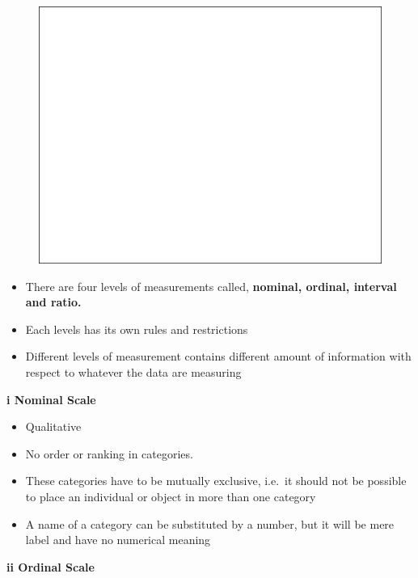 \documentclass[]{book}
\providecommand{\tightlist}{%
  \setlength{\itemsep}{0pt}\setlength{\parskip}{0pt}}
\begin{document}
\begin{figure}

{\centering \includegraphics[width=1\linewidth]{figure/box3-1} 

}

\end{figure}

\begin{itemize}
\tightlist
\item
  There are four levels of measurements called, \textbf{nominal, ordinal, interval and ratio.}
\item
  Each levels has its own rules and restrictions
\item
  Different levels of measurement contains different amount of information with respect to whatever the data are measuring
\end{itemize}

\textbf{i Nominal Scale}

\begin{itemize}
\tightlist
\item
  Qualitative
\item
  No order or ranking in categories.
\item
  These categories have to be mutually exclusive, i.e.~it should not be possible to place an individual or object in more than one category
\item
  A name of a category can be substituted by a number, but it will be mere label and have no numerical meaning
\end{itemize}

\textbf{ii Ordinal Scale}
\end{document}
